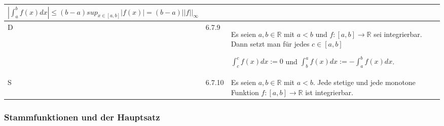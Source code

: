\begin{longtable}{p{0.75cm} p{1cm} p{16cm}}
                        \centerline{$ |\int_a^bf(x) dx| \leq (b-a) sup_{x\in[a,b]} |f(x)| = (b-a)||f||_{\infty} $} \\
        \midrule
        D   & 6.7.9 &   Es seien $a, b \in \mathbb{R}$ mit $a < b$ und $f: [a,b] \rightarrow \mathbb{R}$ sei integrierbar. Dann setzt man für jedes
                        $ c \in [a,b]$ \hfill \break
                        \centerline{$ \int_c^c f(x)dx := 0$ und $\int_b^a f(x) dx := - \int_a^b f(x) dx$.} \\
        \midrule
        S   & 6.7.10&   Es seien $a, b \in \mathbb{R}$ mit $a<b$. Jede stetige und jede monotone Funktion $f : [a,b] \rightarrow \mathbb{R}$
                        ist integrierbar. \\ 

        \bottomrule

    \end{longtable}

\pagebreak

\subsubsection{Stammfunktionen und der Hauptsatz}

